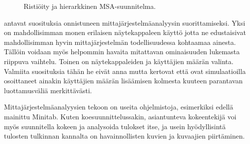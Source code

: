 \documentclass[12pt,a4paper,finnish]{tutthesis}
\begin{document}
\begin{figure}
\begin{center}
    \caption[Ristiöity ja hierarkkinen suunnitelma]{Ristiöity ja hierarkkinen MSA-suunnitelma.}

    \label{fig:crossedandnested}
  \end{center}
\end{figure}



\textcite{Burdick2003} antavat suosituksia onnistuneen mittajärjestelmäanalyysin
suorittamiseksi. Yksi on mahdollisimman monen erilaisen näytekappaleen
käyttö jotta ne edustaisivat mahdollisimman hyvin mittajärjestelmän
todellisuudessa kohtaamaa ainesta.
Tällöin voidaan myös helpommin havaita
mitattavan ominaisuuden lukemasta riippuva vaihtelu. Toinen on näytekappaleiden
ja käyttäjien määrän valinta. Valmiita suosituksia tähän he eivät anna mutta
kertovat että \textcite{burdick1997confidence} ovat
simulaatioilla osoittaneet ainakin käyttäjien määrän lisäämisen kolmesta
kuuteen parantavan luottamusväliä merkittävästi.







Mittajärjestelmäanalyysien tekoon on useita ohjelmistoja, esimerkiksi edellä mainittu
Minitab. Kuten koesuunnittelussakin, asiantunteva kokeentekijä voi myös
suunnitella kokeen ja analysoida tulokset itse, ja usein hyödyllisintä tulosten
tulkinnan kannalta on havainnollisten kuvien ja kuvaajien piirtäminen.
\end{document}
